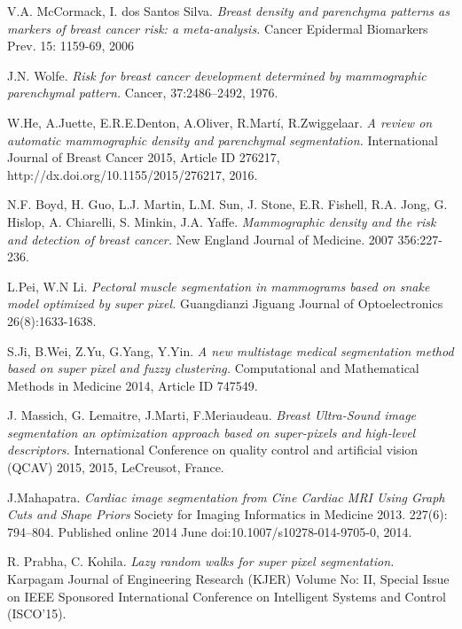 \documentclass{article}
\begin{document}
{\newpage
\begin{thebibliography}{9}
V.A. McCormack, I. dos Santos Silva. 
\textit{Breast density and parenchyma patterns as markers of breast cancer risk: a meta-analysis.} 
Cancer Epidermal Biomarkers Prev. 15: 1159-69, 2006
	
J.N. Wolfe. 
\textit{Risk for breast cancer development determined by mammographic parenchymal pattern.} 
Cancer, 37:2486–2492, 1976.

 W.He, A.Juette, E.R.E.Denton, A.Oliver, R.Martí, R.Zwiggelaar.
\textit{A review on automatic mammographic density and 	parenchymal segmentation.} International Journal of Breast Cancer 2015,  Article ID 276217, http://dx.doi.org/10.1155/2015/276217, 2016.
	
N.F. Boyd, H. Guo, L.J. Martin, L.M. Sun, J. Stone, E.R. Fishell, R.A. Jong,  G. Hislop, A. Chiarelli, S. Minkin, J.A. Yaffe. 
\textit{Mammographic density and the risk and detection of breast cancer.} 
New England Journal of 	Medicine. 2007 356:227-236.

L.Pei, W.N Li. 
\textit{Pectoral muscle segmentation in mammograms based on snake model optimized by super 	pixel.}
Guangdianzi Jiguang Journal of Optoelectronics 26(8):1633-1638.

S.Ji, B.Wei,  Z.Yu, G.Yang, Y.Yin.
\textit{A new multistage medical segmentation method based on super pixel and fuzzy 	clustering.} Computational and Mathematical Methods in Medicine 2014, Article ID 747549.

J. Massich, G. Lemaitre,  J.Marti,  F.Meriaudeau.
\textit{Breast Ultra-Sound image segmentation an optimization approach based on super-pixels and high-level descriptors.} 
International Conference on quality control and artificial vision (QCAV) 2015,  2015, LeCreusot, France.

J.Mahapatra.
\textit{Cardiac image segmentation from Cine Cardiac MRI Using Graph Cuts and Shape Priors} Society for Imaging Informatics in Medicine 2013.
227(6): 794–804. Published online 2014 June doi:10.1007/s10278-014-9705-0, 2014.

R. Prabha, C. Kohila. 
\textit{Lazy random walks for super pixel segmentation.} Karpagam Journal of 	Engineering Research (KJER) Volume No: II, Special Issue on IEEE Sponsored International 	Conference on Intelligent Systems and Control (ISCO’15).



\end{thebibliography}}
\end{document}

